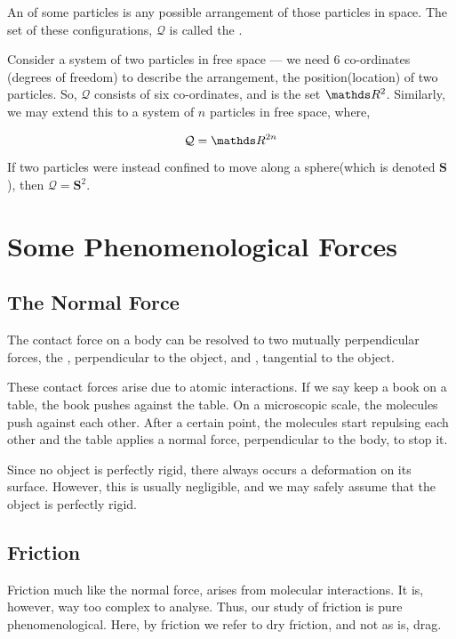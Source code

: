 An  of some particles is any possible arrangement of 
those particles in space. The set of these configurations, \(\mathcal{Q}\) is called the .

Consider a system of two particles in free space --- we need \(6\) co-ordinates (degrees of 
freedom) to describe the arrangement, the position(location) of two particles. So, 
\(\mathcal{Q}\) consists of six co-ordinates, and is the set \(\RR^2\). Similarly, we 
may extend this to a system of \(n\) particles in free space, where,

\begin{equation*}
    \mathcal{Q} = \RR^{2n}
\end{equation*}

If two particles were instead confined to move along a sphere(which is denoted \(\mathbf{S}\)),
then \(\mathcal{Q} = \mathbf{S}^2\).

\section{Some Phenomenological Forces}

\subsection{The Normal Force}

The contact force on a body can be resolved to two mutually perpendicular forces, the ,
perpendicular to the object, and , tangential to the object. 

These contact forces arise due to atomic interactions. If we say keep a book on a table,
the book pushes against the table. On a microscopic scale, the molecules push against each other.
After a certain point, the molecules start repulsing each other and the table applies a normal force,
perpendicular to the body, to stop it. 

Since no object is perfectly rigid, there always occurs a deformation on its surface. However, 
this is usually negligible, and we may safely assume that the object is perfectly rigid. 

\subsection{Friction}

Friction much like the normal force, arises from molecular interactions.
It is, however, way too complex to analyse. Thus, our study of friction is 
pure phenomenological. Here, by friction we refer to dry friction, and not as is, drag. 


